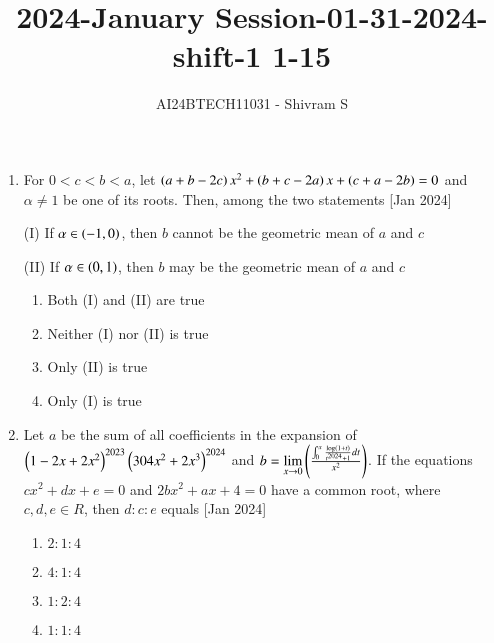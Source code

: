 \documentclass[journal]{IEEEtran}
\begin{document}

\onecolumn

\title{2024-January Session-01-31-2024-shift-1 1-15}
\author{AI24BTECH11031 - Shivram S}
\maketitle
\bigskip

\renewcommand{\thefigure}{\theenumi}
\renewcommand{\thetable}{\theenumi}

\begin{enumerate}


    
    \item For $0 < c < b < a$, let $\left(a + b - 2c\right)x^2 + \left(b + c - 2a\right)x
    + \left(c + a - 2b\right) = 0$ and $\alpha \ne 1$ be one of its roots.
    Then, among the two statements
    \hfill{[Jan 2024]}

    
    (I) If $\alpha \in \left(-1, 0\right)$, then $b$ cannot be the geometric
    mean of $a$ and $c$
    
    (II) If $\alpha \in \left(0, 1\right)$, then $b$ may be the geometric
    mean of $a$ and $c$

    \begin{multicols}{2}
\begin{enumerate}

        \item Both (I) and (II) are true
        \item Neither (I) nor (II) is true
        \item Only (II) is true
        \item Only (I) is true
    \end{enumerate}
\end{multicols}

    \item Let $a$ be the sum of all coefficients in the
        expansion of $\left(1 - 2x + 2x^2\right)^{2023} \left(3 0 4x^2+2x^3\right)^{2024}$
        and $b = \lim\limits_{x \to 0} \left(\frac{\int_0^x \frac{\log\left(1+t\right)}{t^{2024} + 1} dt} {x^2}\right)$.
    If the equations $cx^2 + dx + e = 0$ and $2bx^2 + ax + 4 = 0$
    have a common root, where $c, d, e \in R$, then $d : c : e$ equals
    \hfill{[Jan 2024]}
    
    \begin{multicols}{4}
\begin{enumerate}

        \item $2:1:4$
        \item $4:1:4$
        \item $1:2:4$
        \item $1:1:4$
    \end{enumerate}
\end{multicols}


\end{enumerate}
\end{document}
